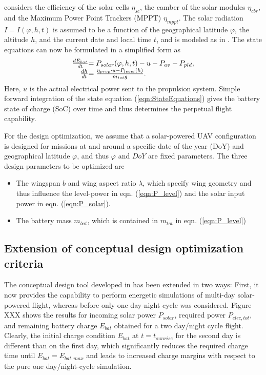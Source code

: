 \documentclass[letterpaper, 10 pt, conference]{ieeeconf}  %
\begin{document}
considers the efficiency of the solar cells $\eta_{sc}$, the camber of the solar modules $\eta_{cbr}$, and the Maximum Power Point Trackers (MPPT) $\eta_{mppt}$. The solar radiation $I=I(\varphi,h,t)$ is assumed to be a function of the geographical latitude $\varphi$, the altitude $h$, and the current date and local time $t$, and is modeled as in \cite{Duffie_SolarEngineering}.
The state equations can now be formulated in a simplified form as
\begin{equation}\label{eqn:StateEquations}
\begin{array}{r@{}l}
\frac{dE_{bat}}{dt}&=P_{solar}(\varphi,h,t)-u-P_{av}-P_{pld},\\
\frac{dh}{dt}&=\frac{\eta_{prop}\cdot u-P_{level}(h)}{m_{tot}g} .
\end{array}
\end{equation}
Here, $u$ is the actual electrical power sent to the propulsion system. Simple forward integration of the state equation (\ref{eqn:StateEquations}) gives the battery state of charge (SoC) over time and thus determines the perpetual flight capability.

For the design optimization, we assume that a solar-powered UAV configuration is designed for missions at and around a specific date of the year (DoY) and geographical latitude $\varphi$, and thus $\varphi$ and $DoY$ are fixed parameters. The three design parameters to be optimized are
\begin{itemize}
\item The wingspan $b$ and wing aspect ratio $\lambda$, which specify wing geometry and thus influence the level-power in eqn. (\ref{eqn:P_level}) and the solar input power in eqn. (\ref{eqn:P_solar}).
\item The battery mass $m_{bat}$, which is contained in $m_{tot}$ in eqn. (\ref{eqn:P_level}) 
\end{itemize}
\subsection{Extension of conceptual design optimization criteria}

The conceptual design tool developed in \cite{Noth_PhD,Leutenegger_JIRS} has been extended in two ways: First, it now provides the capability to perform energetic simulations of multi-day solar-powered flight, whereas before only one day-night cycle was considered. Figure XXX shows the results for incoming solar power $P_{solar}$, required power $P_{elec,tot}$, and remaining battery charge $E_{bat}$ obtained for a two day/night cycle flight. Clearly, the initial charge condition $E_{bat}$ at $t=t_{sunrise}$ for the second day is different than on the first day, which significantly reduces the required charge time until $E_{bat}=E_{bat,max}$ and leads to increased charge margins with respect to the pure one day/night-cycle simulation.
\end{document}
